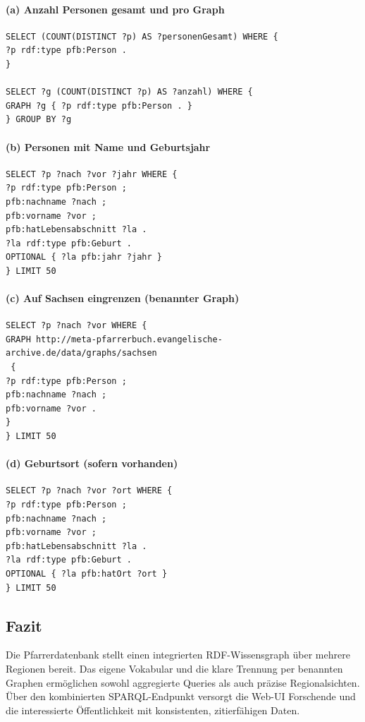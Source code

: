 \paragraph{(a) Anzahl Personen gesamt und pro Graph}
\begin{verbatim}
SELECT (COUNT(DISTINCT ?p) AS ?personenGesamt) WHERE {
?p rdf:type pfb:Person .
}

SELECT ?g (COUNT(DISTINCT ?p) AS ?anzahl) WHERE {
GRAPH ?g { ?p rdf:type pfb:Person . }
} GROUP BY ?g
\end{verbatim}

\paragraph{(b) Personen mit Name und Geburtsjahr}
\begin{verbatim}
SELECT ?p ?nach ?vor ?jahr WHERE {
?p rdf:type pfb:Person ;
pfb:nachname ?nach ;
pfb:vorname ?vor ;
pfb:hatLebensabschnitt ?la .
?la rdf:type pfb:Geburt .
OPTIONAL { ?la pfb:jahr ?jahr }
} LIMIT 50
\end{verbatim}

\paragraph{(c) Auf Sachsen eingrenzen (benannter Graph)}
\begin{verbatim}
SELECT ?p ?nach ?vor WHERE {
GRAPH http://meta-pfarrerbuch.evangelische-archive.de/data/graphs/sachsen
 {
?p rdf:type pfb:Person ;
pfb:nachname ?nach ;
pfb:vorname ?vor .
}
} LIMIT 50
\end{verbatim}

\paragraph{(d) Geburtsort (sofern vorhanden)}
\begin{verbatim}
SELECT ?p ?nach ?vor ?ort WHERE {
?p rdf:type pfb:Person ;
pfb:nachname ?nach ;
pfb:vorname ?vor ;
pfb:hatLebensabschnitt ?la .
?la rdf:type pfb:Geburt .
OPTIONAL { ?la pfb:hatOrt ?ort }
} LIMIT 50
\end{verbatim}

\subsection{Fazit}
Die Pfarrerdatenbank stellt einen integrierten RDF-Wissensgraph über mehrere Regionen bereit. Das eigene Vokabular und die klare Trennung per benannten Graphen ermöglichen sowohl aggregierte Queries als auch präzise Regionalsichten. Über den kombinierten SPARQL-Endpunkt versorgt die Web-UI Forschende und die interessierte Öffentlichkeit mit konsistenten, zitierfähigen Daten.








